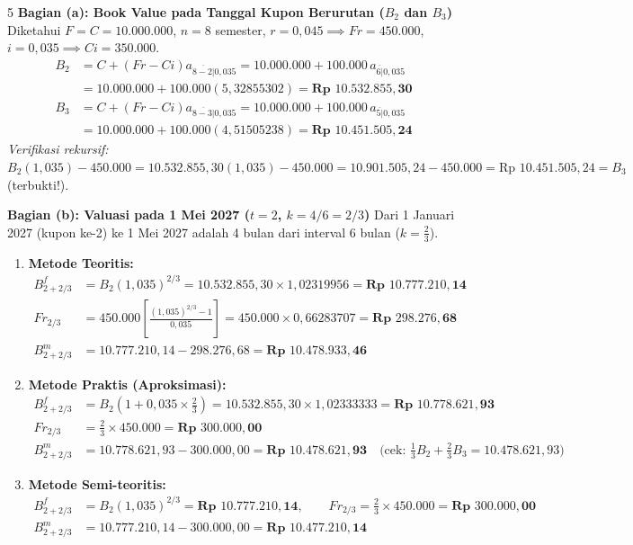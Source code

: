 \documentclass[11pt,a4paper]{article}
\newcommand{\angl}[1]{\overline{#1|}}
\begin{document}
\begin{solusibox}{5}
\textbf{Bagian (a): Book Value pada Tanggal Kupon Berurutan ($B_2$ dan $B_3$)}
Diketahui $F = C = 10.000.000$, $n = 8$ semester, $r = 0{,}045 \implies Fr = 450.000$, $i = 0{,}035 \implies Ci = 350.000$.
\begin{align*}
    B_2 &= C + (Fr - Ci)a_{\angl{8-2}0{,}035} = 10.000.000 + 100.000 \, a_{\angl{6}0{,}035} \\
        &= 10.000.000 + 100.000(5{,}32855302) = \mathbf{\text{Rp }10.532.855{,}30} \\
    B_3 &= C + (Fr - Ci)a_{\angl{8-3}0{,}035} = 10.000.000 + 100.000 \, a_{\angl{5}0{,}035} \\
        &= 10.000.000 + 100.000(4{,}51505238) = \mathbf{\text{Rp }10.451.505{,}24}
\end{align*}
\textit{Verifikasi rekursif:} $B_2(1{,}035) - 450.000 = 10.532.855{,}30(1{,}035) - 450.000 = 10.901.505{,}24 - 450.000 = \text{Rp }10.451.505{,}24 = B_3$ (terbukti!).

\textbf{Bagian (b): Valuasi pada 1 Mei 2027 ($t = 2$, $k = 4/6 = 2/3$)}
Dari 1 Januari 2027 (kupon ke-2) ke 1 Mei 2027 adalah 4 bulan dari interval 6 bulan ($k = \frac{2}{3}$).
\begin{enumerate}[leftmargin=6mm, topsep=1pt, itemsep=2pt]
    \item \textbf{Metode Teoritis:}
    \begin{align*}
        B_{2+2/3}^f &= B_2 (1{,}035)^{2/3} = 10.532.855{,}30 \times 1{,}02319956 = \mathbf{\text{Rp }10.777.210{,}14} \\
        Fr_{2/3} &= 450.000 \left[\frac{(1{,}035)^{2/3} - 1}{0{,}035}\right] = 450.000 \times 0{,}66283707 = \mathbf{\text{Rp }298.276{,}68} \\
        B_{2+2/3}^m &= 10.777.210{,}14 - 298.276{,}68 = \mathbf{\text{Rp }10.478.933{,}46}
    \end{align*}
    \item \textbf{Metode Praktis (Aproksimasi):}
    \begin{align*}
        B_{2+2/3}^f &= B_2 \left(1 + 0{,}035 \times \tfrac{2}{3}\right) = 10.532.855{,}30 \times 1{,}02333333 = \mathbf{\text{Rp }10.778.621{,}93} \\
        Fr_{2/3} &= \tfrac{2}{3} \times 450.000 = \mathbf{\text{Rp }300.000{,}00} \\
        B_{2+2/3}^m &= 10.778.621{,}93 - 300.000{,}00 = \mathbf{\text{Rp }10.478.621{,}93} \quad \big(\text{cek: } \tfrac{1}{3}B_2 + \tfrac{2}{3}B_3 = 10.478.621{,}93\big)
    \end{align*}
    \item \textbf{Metode Semi-teoritis:}
    \begin{align*}
        B_{2+2/3}^f &= B_2 (1{,}035)^{2/3} = \mathbf{\text{Rp }10.777.210{,}14}, \qquad Fr_{2/3} = \tfrac{2}{3} \times 450.000 = \mathbf{\text{Rp }300.000{,}00} \\
        B_{2+2/3}^m &= 10.777.210{,}14 - 300.000{,}00 = \mathbf{\text{Rp }10.477.210{,}14}
    \end{align*}
\end{enumerate}


\end{solusibox}
\end{document}
